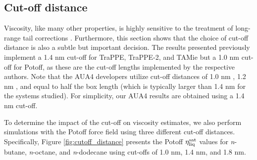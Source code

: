 \documentclass[preprint,review,12pt]{elsarticle}
\begin{document}
	
	\subsection{Cut-off distance} \label{Cut-off distance}
	
	Viscosity, like many other properties, is highly sensitive to the treatment of long-range tail corrections \cite{Leonard2018}. Furthermore, this section shows that the choice of cut-off distance is also a subtle but important decision. The results presented previously implement a 1.4 nm cut-off for TraPPE, TraPPE-2, and TAMie but a 1.0 nm cut-off for Potoff, as these are the cut-off lengths implemented by the respective authors. Note that the AUA4 developers utilize cut-off distances of 1.0 nm \cite{AUA4,Nieto2006,Bourasseau2002}, 1.2 nm \cite{Nieto2008}, and equal to half the box length \cite{Bourasseau2003,Perez2008} (which is typically larger than 1.4 nm for the systems studied). For simplicity, our AUA4 results are obtained using a 1.4 nm cut-off.
	
	To determine the impact of the cut-off on viscosity estimates, we also perform simulations with the Potoff force field using three different cut-off distances. Specifically, Figure \ref{fig:cutoff_distance} presents the Potoff $\eta_{\rm liq}^{\rm sat}$ values for \textit{n}-butane, \textit{n}-octane, and \textit{n}-dodecane using cut-offs of 1.0 nm, 1.4 nm, and 1.8 nm.
	
	
	
	
\end{document}

